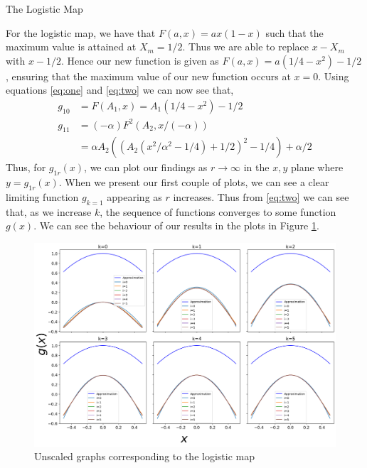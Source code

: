 \begin{exmp} The Logistic Map

    For the logistic map, we have that $F(a,x)=ax(1-x)$ such that the maximum value is attained at $X_m =1/2$. Thus we are able to replace $x-X_m$ with $x-1/2$. Hence our new function is given as $F(a,x)=a(1/4-x^2)-1/2$, ensuring that the maximum value of our new function occurs at $x=0$. Using equations \eqref{eq:one} and \eqref{eq:two} we can now see that,
    \begin{align}
        g_{10}&=F(A_1,x)=A_1(1/4-x^2)-1/2 \nonumber \\
        g_{11}&=(-\alpha)F^2(A_2,x/(-\alpha)) \nonumber \\
        &= \alpha A_2 \left(\left(A_2 \left(x^{2}/\alpha^2 - 1/4\right) + 1/2\right)^{2} - 1/4\right) + \alpha/2
    \end{align}
    Thus, for $g_{1r}(x)$, we can plot our findings as $r \to \infty$ in the $x, y$ plane where $y=g_{1r}(x)$. 
	When we present our first couple of plots, we can see a clear limiting function $g_{k=1}$ appearing as $r$ increases. Thus from \eqref{eq:two} we can see that, as we increase $k$, the sequence of functions converges to some function $g(x)$. 
	We can see the behaviour of our results in the plots in Figure \ref{fig:unscaled}.
	\begin{figure}
    \centering
    \includegraphics[width=1\textwidth]{Feigenbaum Approx Graphs/Images/feigenbaum.png}
    \caption{Unscaled graphs corresponding to the logistic map}
    \label{fig:unscaled}
\end{figure}
    


\end{exmp}
